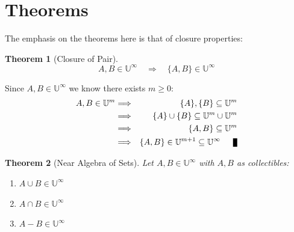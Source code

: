 \documentclass[twoside]{article}
\newcommand{\nthus}[2][U]{\ensuremath{\mathbb{#1}^{#2}}}
\newcommand{\stratified}{\ensuremath{\mathbb{U}^\infty}}
\newcommand{\then}{\ensuremath{\quad\Longrightarrow\quad}}
\newtheorem{theorem}{Theorem}
\newenvironment{proof}[1][Proof]{\begin{trivlist}
\item[\hskip \labelsep {\bfseries #1}]}{\end{trivlist}}
\newcommand{\qed}{\nobreak \ifvmode \relax \else
      \ifdim\lastskip<1.5em \hskip-\lastskip
      \hskip1.5em plus0em minus0.5em \fi \nobreak
      \vrule height0.75em width0.5em depth0.25em\fi}
\begin{document}
\newpage

\section*{Theorems}

The emphasis on the theorems here is that of closure properties:

\begin{theorem}[Closure of Pair]
$$ A,B\in\stratified\then\{A,B\}\in\stratified $$
\end{theorem}

\begin{proof}
Since $ A,B\in\stratified $ we know there exists $ m\ge 0 $:
\begin{eqnarray*}
A,B\in\nthus{m} & \Longrightarrow & \{A\},\{B\}\subseteq\nthus{m} \\
 & \Longrightarrow & \{A\}\cup\{B\}\subseteq\nthus{m}\cup\nthus{m} \\
 & \Longrightarrow & \{A,B\}\subseteq\nthus{m} \\
 & \Longrightarrow & \{A,B\}\in\nthus{m+1}\subseteq\stratified\qed
\end{eqnarray*}
\end{proof}

\begin{theorem}[Near Algebra of Sets]
Let $ A,B\in\stratified $ with $ A,B $ as collectibles:
\begin{enumerate}
\item $ A\cup B\in\stratified $
\item $ A\cap B\in\stratified $
\item $ A-B\in\stratified $
\end{enumerate}
\end{theorem}
\end{document}

